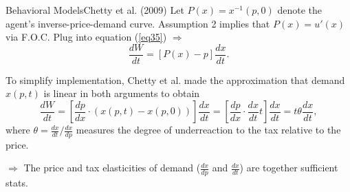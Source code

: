 \documentclass{beamer}
\begin{document}
\begin{frame}{Behavioral Models}{Chetty et al. (2009)}
	Let $P(x)=x^{-1}(p,0)$ denote the agent’s inverse-price-demand curve. Assumption 2 implies that $P(x)=u'(x)$ via F.O.C. Plug into equation (\ref{eq35}) $\Rightarrow$
	\begin{equation}
		\frac{dW}{dt}=[P(x)-p]\frac{dx}{dt}.
	\end{equation}

	To simplify implementation, Chetty et al. made the approximation that demand $x(p,t)$ is linear in both arguments to obtain
	\begin{equation}
		\frac{dW}{dt} = \left[\frac{dp}{dx}\cdot (x(p,t)-x(p,0))\right]\frac{dx}{dt}=\left[\frac{dp}{dx}\cdot \frac{dx}{dt}t\right]\frac{dx}{dt} = t\theta\frac{dx}{dt},
	\end{equation}
	where $\theta=\frac{dx}{dt}/\frac{dx}{dp}$ measures the degree of underreaction to the tax relative to the price.

	$\Rightarrow$ The price and tax elasticities of demand ($\frac{dx}{dp}$ and $\frac{dx}{dt}$) are together sufficient stats.
\end{frame}
\end{document}
